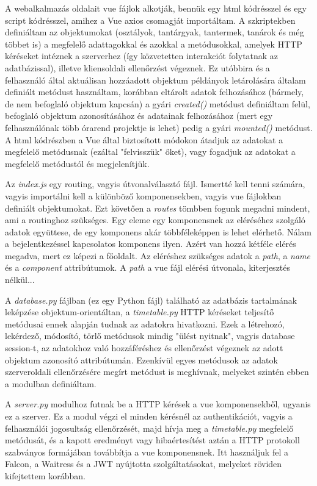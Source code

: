 \documentclass[12pt,a4paper]{report}
\begin{document}
A webalkalmazás oldalait vue fájlok alkotják, bennük egy html kódrésszel és egy script kódrésszel, amihez a Vue axios csomagját importáltam. A szkriptekben definiáltam az objektumokat (osztályok, tantárgyak, tantermek, tanárok és még többet is) a megfelelő adattagokkal és azokkal a metódusokkal, amelyek HTTP kéréseket intéznek a szerverhez (így közvetetten interakciót folytatnak az adatbázissal), illetve kliensoldali ellenőrzést végeznek. Ez utóbbira és a felhasználó által aktuálisan hozzáadott objektum példányok letárolására általam definiált metódust használtam, korábban eltárolt adatok felhozásához (bármely, de nem befoglaló objektum kapcsán) a gyári \textit{created()} metódust definiáltam felül, befoglaló objektum azonosításához és adatainak felhozásához (mert egy felhasználónak több órarend projektje is lehet) pedig a gyári \textit{mounted()} metódust. A html kódrészben a Vue által biztosított módokon átadjuk az adatokat a megfelelő metódusnak (ezáltal "felvisszük" őket), vagy fogadjuk az adatokat a megfelelő metódustól és megjelenítjük.

Az \textit{index.js} egy routing, vagyis útvonalválasztó fájl. Ismertté kell tenni számára, vagyis importálni kell a különböző komponensekben, vagyis vue fájlokban definiált objektumokat. Ezt követően a \textit{routes} tömbben fogunk megadni mindent, ami a routinghoz szükséges. Egy eleme egy komponensnek az eléréséhez szolgáló adatok együttese, de egy komponens akár többféleképpen is lehet elérhető. Nálam a bejelentkezéssel kapcsolatos komponens ilyen. Azért van hozzá kétféle elérés megadva, mert ez képezi a főoldalt. Az eléréshez szükséges adatok a \textit{path}, a \textit{name} és a \textit{component} attribútumok. A \textit{path} a vue fájl elérési útvonala, kiterjesztés nélkül...

A \textit{database.py} fájlban (ez egy Python fájl) található az adatbázis tartalmának leképzése objektum-orientáltan, a \textit{timetable.py} HTTP kéréseket teljesítő metódusai ennek alapján tudnak az adatokra hivatkozni. Ezek a létrehozó, lekérdező, módosító, törlő metódusok mindig "ülést nyitnak", vagyis database session-t, az adatokhoz való hozzáféréshez és ellenőrzést végeznek az adott objektum azonosító attribútumán. Ezenkívül egyes metódusok az adatok szerveroldali ellenőrzésére megírt metódust is meghívnak, melyeket szintén ebben a modulban definiáltam.

A \textit{server.py} modulhoz futnak be a HTTP kérések a vue komponensekből, ugyanis ez a szerver. Ez a modul végzi el minden kérésnél az authentikációt, vagyis a felhasználói jogosultság ellenőrzését, majd hívja meg a \textit{timetable.py} megfelelő metódusát, és a kapott eredményt vagy hibaértesítést aztán a HTTP protokoll szabványos formájában továbbítja a vue komponensnek. Itt használjuk fel a Falcon, a Waitress és a JWT nyújtotta szolgáltatásokat, melyeket röviden kifejtettem korábban.
\end{document}
